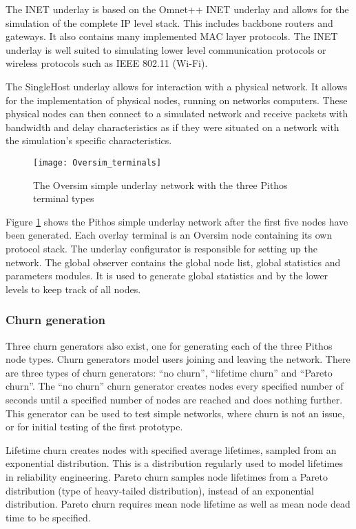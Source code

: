 The INET underlay is based on the Omnet++ INET underlay and allows for the simulation of the complete IP level stack. This includes backbone routers and gateways. It also contains many implemented MAC layer protocols. The INET underlay is well suited to simulating lower level communication protocols or wireless protocols such as IEEE 802.11 (Wi-Fi).

The SingleHost underlay allows for interaction with a physical network. It allows for the implementation of physical nodes, running on networks computers. These physical nodes can then connect to a simulated network and receive packets with bandwidth and delay characteristics as if they were situated on a network with the simulation's specific characteristics.

\begin{figure}[htbp]
 \centering
 \texttt{[image: Oversim\_terminals]}
 \caption{The Oversim simple underlay network with the three Pithos terminal types}
 \label{fig_oversim_terminals}
\end{figure}

Figure \ref{fig_oversim_terminals} shows the Pithos simple underlay network after the first five nodes have been generated. Each overlay terminal is an Oversim node containing its own protocol stack. The underlay configurator is responsible for setting up the network. The global observer contains the global node list, global statistics and parameters modules. It is used to generate global statistics and by the lower levels to keep track of all nodes.

\subsubsection{Churn generation}
Three churn generators also exist, one for generating each of the three Pithos node types. Churn generators model users joining and leaving the network. There are three types of churn generators: ``no churn'', ``lifetime churn'' and ``Pareto churn''. The ``no churn'' churn generator creates nodes every specified number of seconds until a specified number of nodes are reached and does nothing further. This generator can be used to test simple networks, where churn is not an issue, or for initial testing of the first prototype.

Lifetime churn creates nodes with specified average lifetimes, sampled from an exponential distribution. This is a distribution regularly used to model lifetimes in reliability engineering. Pareto churn samples node lifetimes from a Pareto distribution (type of heavy-tailed distribution), instead of an exponential distribution. Pareto churn requires mean node lifetime as well as mean node dead time to be specified.


